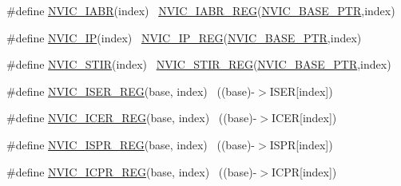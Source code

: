 \begin{DoxyCompactItemize}
\item 
\#define \hyperlink{group___n_v_i_c___register___accessor___macros_gaf953d0f112753c05f951d7163e98e6fc}{N\+V\+I\+C\+\_\+\+I\+A\+BR}(index)                                              ~\hyperlink{group___n_v_i_c___register___accessor___macros_gafa3b717b76dfe3379645d3c4eaebaf6b}{N\+V\+I\+C\+\_\+\+I\+A\+B\+R\+\_\+\+R\+EG}(\hyperlink{group___n_v_i_c___peripheral_ga28f0a055d0c218e16d1fc7b13ff0caa5}{N\+V\+I\+C\+\_\+\+B\+A\+S\+E\+\_\+\+P\+TR},index)
\item 
\#define \hyperlink{group___n_v_i_c___register___accessor___macros_gad215e21e79fd6c4c0b310324a51b0a34}{N\+V\+I\+C\+\_\+\+IP}(index)                                                  ~\hyperlink{group___n_v_i_c___register___accessor___macros_gac7b3df65f95ff3ad60a655db439a45a2}{N\+V\+I\+C\+\_\+\+I\+P\+\_\+\+R\+EG}(\hyperlink{group___n_v_i_c___peripheral_ga28f0a055d0c218e16d1fc7b13ff0caa5}{N\+V\+I\+C\+\_\+\+B\+A\+S\+E\+\_\+\+P\+TR},index)
\item 
\#define \hyperlink{group___n_v_i_c___register___accessor___macros_gab9c445f4619c4c409389ab409be52b99}{N\+V\+I\+C\+\_\+\+S\+T\+IR}(index)                                              ~\hyperlink{group___n_v_i_c___register___accessor___macros_gae670827a5fdf3912afe9fa24578a19e3}{N\+V\+I\+C\+\_\+\+S\+T\+I\+R\+\_\+\+R\+EG}(\hyperlink{group___n_v_i_c___peripheral_ga28f0a055d0c218e16d1fc7b13ff0caa5}{N\+V\+I\+C\+\_\+\+B\+A\+S\+E\+\_\+\+P\+TR},index)
\item 
\#define \hyperlink{group___n_v_i_c___register___accessor___macros_ga7009a9a09ee7fbb0b2af4cf99eadac4f}{N\+V\+I\+C\+\_\+\+I\+S\+E\+R\+\_\+\+R\+EG}(base,  index)                            ~((base)-\/$>$I\+S\+ER\mbox{[}index\mbox{]})
\item 
\#define \hyperlink{group___n_v_i_c___register___accessor___macros_gac8c6980a2505e16c70595552bc4da081}{N\+V\+I\+C\+\_\+\+I\+C\+E\+R\+\_\+\+R\+EG}(base,  index)                            ~((base)-\/$>$I\+C\+ER\mbox{[}index\mbox{]})
\item 
\#define \hyperlink{group___n_v_i_c___register___accessor___macros_ga6678e35df7fd1dd4a3f515e73983377c}{N\+V\+I\+C\+\_\+\+I\+S\+P\+R\+\_\+\+R\+EG}(base,  index)                            ~((base)-\/$>$I\+S\+PR\mbox{[}index\mbox{]})
\item 
\#define \hyperlink{group___n_v_i_c___register___accessor___macros_gac541bfbfb551d341170d1535a18208b9}{N\+V\+I\+C\+\_\+\+I\+C\+P\+R\+\_\+\+R\+EG}(base,  index)                            ~((base)-\/$>$I\+C\+PR\mbox{[}index\mbox{]})
\item 

\end{DoxyCompactItemize}
